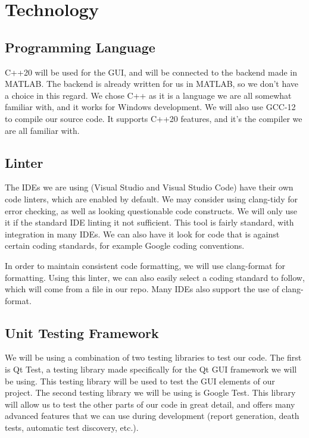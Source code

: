 \documentclass{article}
\begin{document}
\section{Technology}

\subsection{Programming Language}
C++20 will be used for the GUI, and will be connected to the backend made in MATLAB. 
The backend is already written for us in MATLAB, so we don't have a choice in this regard.
We chose C++ as it is a language we are all somewhat familiar with, and it works for
Windows development. We will also use GCC-12 to compile our source code. It supports C++20
features, and it's the compiler we are all familiar with.

\subsection{Linter}
The IDEs we are using (Visual Studio and Visual Studio Code) have their own code linters, which are enabled by default.
We may consider using clang-tidy for error checking, as well as looking questionable code constructs. We will
only use it if the standard IDE linting it not sufficient. This tool is fairly standard, with integration in many 
IDEs. We can also have it look for code that is against certain coding standards, for example Google coding conventions.

In order to maintain consistent code formatting, we will use clang-format for formatting. Using this linter, 
we can also easily select a coding standard to follow, which will come from a file in our repo. Many IDEs
also support the use of clang-format. 

\subsection{Unit Testing Framework}
We will be using a combination of two testing libraries to test our code. The first is Qt Test, a testing library made specifically for the Qt GUI framework we will be using. This testing library will be used to test the GUI elements of our project.
The second testing library we will be using is Google Test. This library will allow us to test the other parts of our code in great detail, and offers many advanced features that we can use during development (report generation, death tests, automatic test discovery, etc.).
\end{document}
